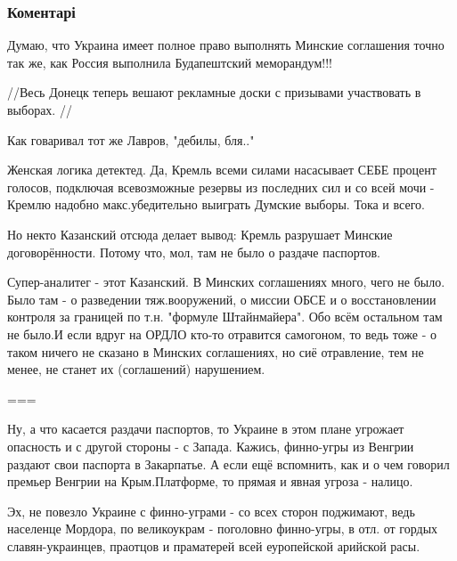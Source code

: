  
 
 
 
 
\subsubsection{Коментарі}

\begin{itemize} %
Думаю, что Украина имеет полное право выполнять Минские соглашения точно так
же, как Россия выполнила Будапештский меморандум!!!



//Весь Донецк теперь вешают рекламные доски с призывами участвовать в выборах. //

Как говаривал тот же Лавров, "дебилы, бля.."

Женская логика детектед. Да, Кремль всеми силами насасывает СЕБЕ процент
голосов, подключая всевозможные резервы из последних сил и со всей мочи -
Кремлю надобно макс.убедительно выиграть Думские выборы. Тока и всего.

Но некто Казанский отсюда делает вывод: Кремль разрушает Минские
договорённости. Потому что, мол, там не было о раздаче паспортов.

Супер-аналитег - этот Казанский. В Минских соглашениях много, чего не было.
Было там - о разведении тяж.вооружений, о миссии ОБСЕ и о восстановлении
контроля за границей по т.н. "формуле Штайнмайера". Обо всём остальном там не
было.И если вдруг на ОРДЛО кто-то отравится самогоном, то ведь тоже - о таком
ничего не сказано в Минских соглашениях, но сиё отравление, тем не менее, не
станет их (соглашений) нарушением.

===

Ну, а что касается раздачи паспортов, то Украине в этом плане угрожает
опасность и с другой стороны - с Запада. Кажись, финно-угры из Венгрии раздают
свои паспорта в Закарпатье. А если ещё вспомнить, как и о чем говорил премьер
Венгрии на Крым.Платформе, то прямая и явная угроза - налицо.

Эх, не повезло Украине с финно-уграми - со всех сторон поджимают, ведь
населенце Мордора, по великоукрам - поголовно финно-угры, в отл. от гордых
славян-украинцев, праотцов и праматерей всей еуропейской арийской расы.


\end{itemize}
